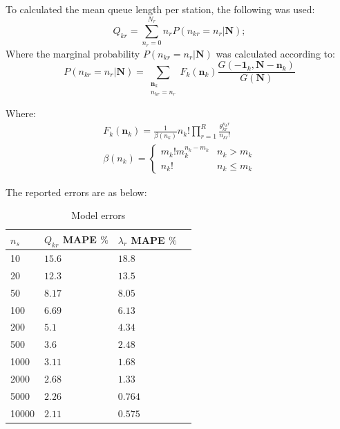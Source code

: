 To calculated the mean queue length per station, the following was used:
\begin{equation*}
    Q_{kr} = \sum_{n_r = 0}^{N_r} n_r P(n_{kr}=n_r | \mathbf{N});
\end{equation*}
Where the marginal probability \(P(n_{kr}=n_r | \mathbf{N})\) was calculated according to:
\begin{equation*}
    P(n_{kr}=n_r | \mathbf{N}) = \sum_{\substack{\mathbf{n}_k \\ n_{kr} = n_r}} F_{k}(\mathbf{n}_k) \frac{ G(-\mathbf{1}_k, \mathbf{N} - \mathbf{n}_k) }{ G(\mathbf{N}) }
\end{equation*}

Where:
\begin{equation*}
\begin{split}
    F_{k}(\mathbf{n}_k) = \frac{1}{\beta(n_k)} n_k! \prod_{r=1}^R \frac{\theta_{kr}^{n_kr}}{n_{kr}!} \\
    \beta(n_k) = \begin{cases} m_k! m_k^{n_k-m_k} & n_k > m_k \\ n_k! & n_k \leq m_k \end{cases}
\end{split}
\end{equation*}

The reported errors are as below:

\begin{table}[!htb] 
\begin{center}
\begin{tabular}{@{}llll@{}}
\toprule
    \(n_s\) & \(Q_{kr}\) MAPE \(\%\) & \(\lambda_r\) MAPE \(\%\) &  \\  \midrule
    10 &\(15.6\) & \(18.8\) &  \\ 
    20 &\(12.3\) & \(13.5\) &  \\ 
    50 &\(8.17\) & \(8.05\) &  \\ 
    100 &\(6.69\) & \(6.13\) &  \\ 
    200 &\(5.1\) & \(4.34\) &  \\ 
    500 &\(3.6\) & \(2.48\) &  \\ 
    1000 &\(3.11\) & \(1.68\) &  \\ 
    2000 &\(2.68\) & \(1.33\) &  \\ 
    5000 &\(2.26\) & \(0.764\) &  \\ 
    10000 &\(2.11\) & \(0.575\) &  \\  \bottomrule
\end{tabular}
\end{center}
\caption{Model errors}
\label{tab:convergence_error_MS}
\end{table}

